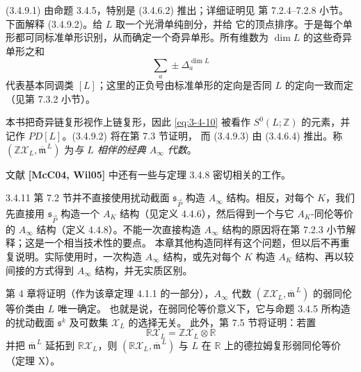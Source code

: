 (3.4.9.1) 由命题 3.4.5，特别是 (3.4.6.2) 推出；详细证明见
第 7.2.4--7.2.8 小节。下面解释 (3.4.9.2)。给 $L$ 取一个光滑单纯剖分，并给
它的顶点排序。于是每个单形都可同标准单形识别，从而确定一个奇异单形。所有维数为
$\dim L$ 的这些奇异单形之和
\begin{equation}
  \sum_a\pm\Delta_a^{\dim L}
  \tag{3.4.10}\label{eq:3-4-10}
\end{equation}
代表基本同调类 $[L]$；这里的正负号由标准单形的定向是否同 $L$ 的定向一致而定
（见第 7.3.2 小节）。

本书把奇异链复形视作上链复形，因此 \eqref{eq:3-4-10} 被看作
$S^0(L;\mathbb Z)$ 的元素，并记作 $PD[L]$。(3.4.9.2) 将在第 7.3 节证明，
而 (3.4.9.3) 由 (3.4.6.4) 推出。称
$(\mathbb Z\mathcal X_L,\overline{\mathfrak m}^{\,L})$ 为\emph{与 $L$ 相伴的经典
$A_\infty$ 代数}。

文献 \textbf{[McC04, Wil05]} 中还有一些与定理 3.4.8 密切相关的工作。

\begin{remark}{3.4.11}\label{rem:3-4-11}
第 7.2 节并不直接使用扰动截面 $\mathfrak s_{\vec P}$ 构造
$A_\infty$ 结构。相反，对每个 $K$，我们先直接用
$\mathfrak s_{\vec P}$ 构造一个 $A_K$ 结构（见定义 4.4.6），然后得到一个与它
$A_K$-同伦等价的 $A_\infty$ 结构（定义 4.4.8）。不能一次直接构造
$A_\infty$ 结构的原因将在第 7.2.3 小节解释；这是一个相当技术性的要点。
本章其他构造同样有这个问题，但以后不再重复说明。实际使用时，一次构造
$A_\infty$ 结构，或先对每个 $K$ 构造 $A_K$ 结构、再以较间接的方式得到
$A_\infty$ 结构，并无实质区别。
\end{remark}

第 4 章将证明（作为该章定理 4.1.1 的一部分），$A_\infty$ 代数
$(\mathbb Z\mathcal X_L,\overline{\mathfrak m}^{\,L})$ 的弱同伦等价类由 $L$ 唯一确定。
也就是说，在弱同伦等价意义下，它与命题 3.4.5 所构造的扰动截面
$\mathfrak s^k$ 及可数集 $\mathcal X_L$ 的选择无关。
此外，第 7.5 节将证明：若置
\[
  \mathbb R\mathcal X_L=\mathbb Z\mathcal X_L\otimes\mathbb R
\]
并把 $\overline{\mathfrak m}^{\,L}$ 延拓到 $\mathbb R\mathcal X_L$，则
$(\mathbb R\mathcal X_L,\overline{\mathfrak m}^{\,L})$ 与 $L$ 在 $\mathbb R$ 上的德拉姆复形弱同伦等价
（定理 X）。
